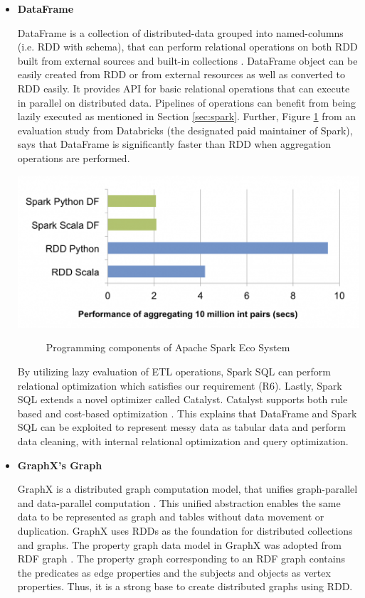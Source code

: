\begin{itemize}
\item \textbf{DataFrame} 

DataFrame is a collection of distributed-data grouped into named-columns (i.e. RDD with schema), that can perform relational operations on both RDD built from external sources and built-in collections \cite{SparkSQL}. DataFrame object can be easily created from RDD or from external resources as well as converted to RDD easily. It provides API for basic relational operations that can execute in parallel on distributed data.  Pipelines of operations can benefit from being lazily executed as mentioned in Section \ref{sec:spark}. Further, Figure \ref{fig:rdd-vs-dataframe} from an evaluation study from Databricks \cite{databricks-dataframe}(the designated paid maintainer of Spark), says that DataFrame is significantly faster than RDD when aggregation operations are performed.
\begin{center}
	\includegraphics[width=38em]{./Figures/rdd-vs-dataframe}
	\begin{figure}[htbp]
    \caption{Programming components of Apache Spark Eco System \cite{databricks-dataframe} }
    \label{fig:rdd-vs-dataframe}
	\end{figure}
\end{center}
By utilizing lazy evaluation of ETL operations, Spark SQL can perform relational optimization \cite{SparkSQL} which satisfies our requirement (R6). Lastly, Spark SQL extends a novel optimizer called Catalyst. Catalyst supports both rule based and cost-based optimization \cite{SparkSQL}. This explains that DataFrame and Spark SQL can be exploited to represent messy data as tabular data and perform data cleaning, with internal relational optimization and query optimization.
\item \textbf{GraphX's Graph }

GraphX is a distributed graph computation model, that unifies graph-parallel and data-parallel computation \cite{GraphX}. This unified abstraction enables the same data to be represented as graph and tables without data movement or duplication. GraphX uses RDDs as the foundation for distributed collections and graphs. The property graph data model in GraphX was adopted from RDF graph \cite{RDFinGraphX}. The property graph corresponding to an RDF graph contains the predicates as edge properties and the subjects and objects as vertex properties. Thus, it is a strong base to create distributed graphs using RDD. 
\end{itemize}
